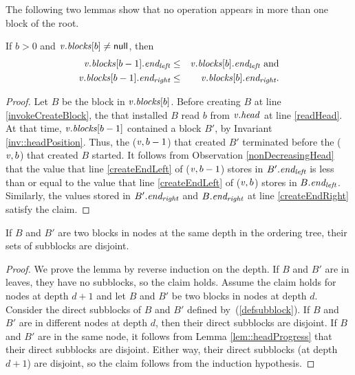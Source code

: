 The following two lemmas show that no operation appears in more than one block of the root.
\begin{lemma} \label{lem::headProgress}
 If $b>0$ and $\mbox{\textnormal{\textit{v}}}.\mbox{\textit{blocks}}[b] \neq \mbox{\sf null}$, then
 \begin{eqnarray*}
 \mbox{\textnormal{\textit{v}}}.\mbox{\textit{blocks}}[b-1].\mbox{\textit{end\textsubscript{left}}} &\leq& \mbox{\textnormal{\textit{v}}}.\mbox{\textit{blocks}}[b].\mbox{\textit{end\textsubscript{left}}} \mbox{ and}\\
 \mbox{\textnormal{\textit{v}}}.\mbox{\textit{blocks}}[b-1].\mbox{\textit{end\textsubscript{right}}} &\leq& \mbox{\textnormal{\textit{v}}}.\mbox{\textit{blocks}}[b].\mbox{\textit{end\textsubscript{right}}}.
 \end{eqnarray*}
\end{lemma}
\begin{proof}
Let $B$ be the block in $\mbox{\textnormal{\textit{v}}}.\mbox{\textit{blocks}}[b]$.
Before creating $B$ at line \ref{invokeCreateBlock}, the  that installed $B$
read $b$ from $\mbox{\textnormal{\textit{v}}}.\mbox{\textit{head}}$ at line \ref{readHead}.
At that time, $\mbox{\textnormal{\textit{v}}}.\mbox{\textit{blocks}}[b-1]$ contained a block $B'$, by Invariant \ref{inv::headPosition}.
Thus, the ($\mbox{\textnormal{\textit{v}}},b-1$) that created $B'$ terminated before the ($\mbox{\textnormal{\textit{v}}},b$) that
created $B$ started.
It follows from Observation \ref{nonDecreasingHead} that the value that 
line \ref{createEndLeft} of ($\mbox{\textnormal{\textit{v}}},b-1$) stores in $B'.\mbox{\textit{end\textsubscript{left}}}$   
is less than or equal to the value that line \ref{createEndLeft} of ($\mbox{\textnormal{\textit{v}}},b$) 
stores in $B.\mbox{\textit{end\textsubscript{left}}}$.
Similarly, the values stored in $B'.\mbox{\textit{end\textsubscript{right}}}$ and $B.\mbox{\textit{end\textsubscript{right}}}$ at line \ref{createEndRight} 
satisfy the claim.
\end{proof}

\begin{lemma} \label{lem::subblocksDistinct}
If $B$ and $B'$ are two blocks in nodes at the same depth in the ordering tree, their sets of subblocks are disjoint.
\end{lemma}
\begin{proof}
We prove the lemma by reverse induction on the depth.
If $B$ and $B'$ are in leaves, they have no subblocks, so the claim holds.
Assume the claim holds for nodes at depth $d+1$ and let $B$ and $B'$ be two blocks in nodes at depth $d$.
Consider the direct subblocks of $B$ and $B'$ defined by~(\ref{defsubblock}).
If $B$ and $B'$ are in different nodes at depth $d$, then their direct subblocks are disjoint.
If $B$ and $B'$ are in the same node, it follows from Lemma \ref{lem::headProgress} that their direct subblocks are disjoint.
Either way, their direct subblocks (at depth $d+1$) are disjoint, so the claim follows from the induction hypothesis.
\end{proof}


